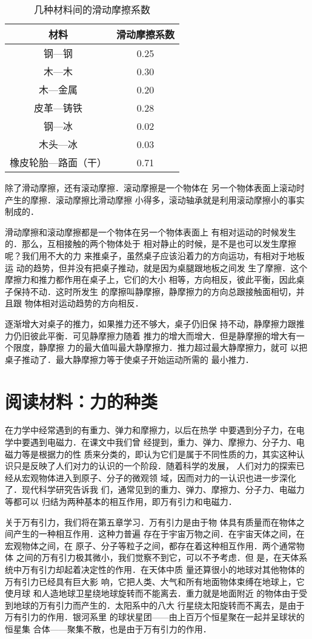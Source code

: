 \begin{table}[htp]\centering
\caption{几种材料间的滑动摩擦系数}
\begin{tabular}{cc}
\hline
材料   &  滑动摩擦系数\\
\hline
钢—钢     & 0.25 \\
木—木   & 0.30 \\
木—金属   &  0.20\\
皮革—铸铁   &  0.28\\
钢—冰   &  0.02\\
木头—冰   &  0.03\\
橡皮轮胎—路面（干）   &  0.71\\
\hline
\end{tabular}
\end{table}

    除了滑动摩擦，还有滚动摩擦．滚动摩擦是一个物体在
另一个物体表面上滚动时产生的摩擦．滚动摩擦比滑动摩擦
小得多，滚动轴承就是利用滚动摩擦小的事实制成的．

    滑动摩擦和滚动摩擦都是一个物体在另一个物体表面上
有相对运动的时候发生的．那么，互相接触的两个物体处于
相对静止的时候，是不是也可以发生摩擦呢？我们用不大的力
来推桌子，虽然桌子应该沿着力的方向运功，有相对于地板运
动的趋势，但并没有把桌子推动，就是因为桌腿跟地板之间发
生了摩擦．这个摩擦力和推力都作用在桌子上，它们的大小
相等，方向相反，彼此平衡，因此桌子保持不动．这时所发生
的摩擦叫静摩擦，静摩擦力的方向总跟接触面相切，并且跟
物体相对运动趋势的方向相反．

    逐渐增大对桌子的推力，如果推力还不够大，桌子仍旧保
持不动，静摩擦力跟推力仍旧彼此平衡．可见静摩擦力随着
推力的增大而增大．但是静摩擦的增大有一个限度，静摩擦
力的最大值叫最大静摩擦力．推力超过最大静摩擦力，就可
以把桌子推动了．最大静摩擦力等于使桌子开始运动所需的
最小推力．


\section*{阅读材料：力的种类}
    在力学中经常遇到的有重力、弹力和摩擦力，以后在热学
中要遇到分子力，在电学中要遇到电磁力．在课文中我们曾
经提到，重力、弹力、摩擦力、分子力、电磁力等是根据力的性
质来分类的，即认为它们是属于不同性质的力，其实这种认
识只是反映了人们对力的认识的一个阶段．随着科学的发展，
人们对力的探索已经从宏观物体进入到原子、分子的微观领
域，因而对力的一认识也进一步深化了．现代科学研究告诉我
们，通常见到的重力、弹力、摩擦力、分子力、电磁力等都可以
归结为两种基本的相互作用，即万有引力和电磁力．

    关于万有引力，我们将在第五章学习．万有引力是由于物
体具有质量而在物体之间产生的一种相互作用．这种力普遍
存在于宇宙万物之间．在宇宙天体之间，在宏观物体之间，在
原子、分子等粒子之间，都存在着这种相互作用．两个通常物体
之间的万有引力极其微小，我们觉察不到它，可以不予考虑．但
是，在天体系统中万有引力却起着决定性的作用．在天体中质
量还算很小的地球对其他物体的万有引力已经具有巨大影
响，它把人类、大气和所有地面物体束缚在地球上，它使月球
和人造地球卫星绕地球旋转而不能离去．重力就是地面附近
的物体由于受到地球的万有引力而产生的．太阳系中的八大
行星绕太阳旋转而不离去，是由于万有引力的作用．银河系里
的球状星团——由上百万个恒星聚在一起并呈球状的恒星集
合体——聚集不散，也是由于万有引力的作用．

